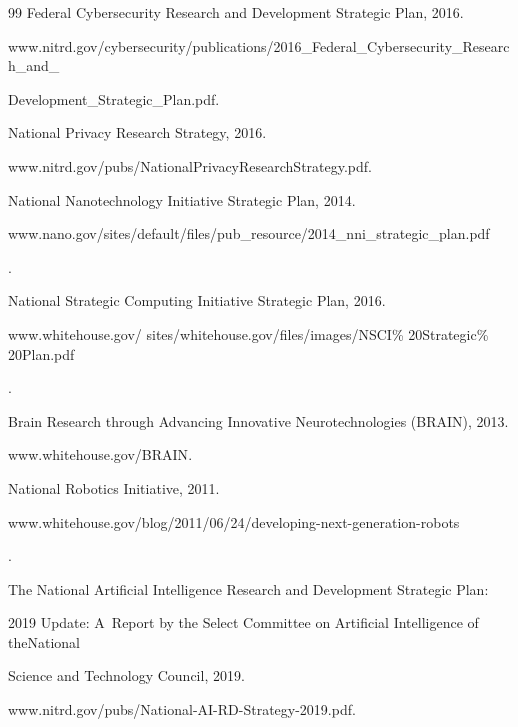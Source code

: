 {{\begin{thebibliography}{99}
Federal Cybersecurity Research and Development Strategic Plan, 2016.


{\sf www.\linebreak nitrd.gov/cybersecurity/publications/2016\_Federal\_Cybersecurity\_Research\_and\_\linebreak 


Development\_Strategic\_Plan.pdf.}




National Privacy Research Strategy, 2016.


     {\sf www.nitrd.gov/pubs/NationalPrivacy\linebreak ResearchStrategy.pdf}.




National Nanotechnology Initiative Strategic Plan, 2014. {\sf


www.nano.gov/sites/\linebreak default/files/pub\_resource/2014\_nni\_strategic\_plan.pdf}.




National Strategic Computing Initiative Strategic Plan, 2016. {\sf


www.whitehouse.gov/ sites/whitehouse.gov/files/images/NSCI\% 20Strategic\% 20Plan.pdf}.




Brain Research through Advancing Innovative Neurotechnologies (BRAIN), 2013.


     {\sf www.whitehouse.gov/BRAIN}.




National Robotics Initiative, 2011. {\sf


www.whitehouse.gov/blog/2011/06/24/\linebreak developing-next-generation-robots}.




The National Artificial Intelligence Research and Development Strategic Plan:


2019 Update: A~Report by the Select Committee on Artificial Intelligence of the\linebreak National


Science and Technology Council, 2019.


{\sf www.nitrd.gov/pubs/National-AI-RD-Strategy-2019.pdf}.








\end{thebibliography}}}

